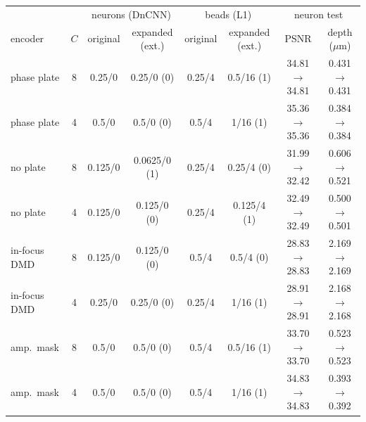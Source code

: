 \begin{tabular}{@{}lc cc cc cc@{}}\toprule
 & & \multicolumn{2}{c}{neurons (DnCNN)} & \multicolumn{2}{c}{beads (L1)} & \multicolumn{2}{c}{neuron test}\\
encoder & $C$ & original & expanded (ext.) & original & expanded (ext.) & PSNR & depth ($\mu$m)\\\midrule
phase plate & 8 & 0.25/0 & 0.25/0 (0) & 0.25/4 & 0.5/16 (1) & 34.81 $\to$ 34.81 & 0.431 $\to$ 0.431\\
phase plate & 4 & 0.5/0 & 0.5/0 (0) & 0.5/4 & 1/16 (1) & 35.36 $\to$ 35.36 & 0.384 $\to$ 0.384\\
no plate & 8 & 0.125/0 & 0.0625/0 (1) & 0.25/4 & 0.25/4 (0) & 31.99 $\to$ 32.42 & 0.606 $\to$ 0.521\\
no plate & 4 & 0.125/0 & 0.125/0 (0) & 0.25/4 & 0.125/4 (1) & 32.49 $\to$ 32.49 & 0.500 $\to$ 0.501\\
in-focus DMD & 8 & 0.125/0 & 0.125/0 (0) & 0.5/4 & 0.5/4 (0) & 28.83 $\to$ 28.83 & 2.169 $\to$ 2.169\\
in-focus DMD & 4 & 0.25/0 & 0.25/0 (0) & 0.25/4 & 1/16 (1) & 28.91 $\to$ 28.91 & 2.168 $\to$ 2.168\\
amp.\ mask & 8 & 0.5/0 & 0.5/0 (0) & 0.5/4 & 0.5/16 (1) & 33.70 $\to$ 33.70 & 0.523 $\to$ 0.523\\
amp.\ mask & 4 & 0.5/0 & 0.5/0 (0) & 0.5/4 & 1/16 (1) & 34.83 $\to$ 34.83 & 0.393 $\to$ 0.392\\
\bottomrule\end{tabular}

